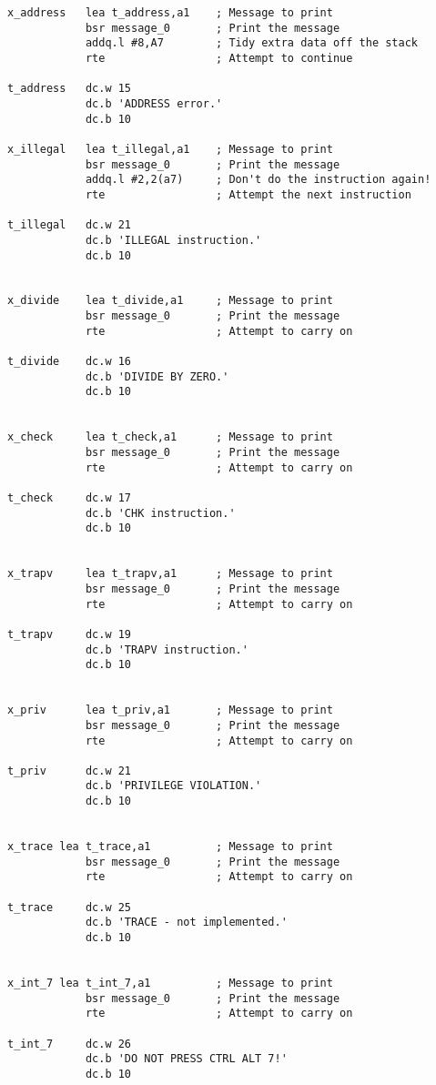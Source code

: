 \begin{lstlisting}[firstnumber=1,caption={Exception Handler for the QL},label={lst:ExceptionHandlerQL}]
x_address   lea t_address,a1    ; Message to print
            bsr message_0       ; Print the message
            addq.l #8,A7        ; Tidy extra data off the stack
            rte                 ; Attempt to continue

t_address   dc.w 15
            dc.b 'ADDRESS error.'
            dc.b 10

x_illegal   lea t_illegal,a1    ; Message to print
            bsr message_0       ; Print the message
            addq.l #2,2(a7)     ; Don't do the instruction again!
            rte                 ; Attempt the next instruction

t_illegal   dc.w 21
            dc.b 'ILLEGAL instruction.'
            dc.b 10


x_divide    lea t_divide,a1     ; Message to print
            bsr message_0       ; Print the message
            rte                 ; Attempt to carry on

t_divide    dc.w 16
            dc.b 'DIVIDE BY ZERO.'
            dc.b 10


x_check     lea t_check,a1      ; Message to print
            bsr message_0       ; Print the message
            rte                 ; Attempt to carry on

t_check     dc.w 17
            dc.b 'CHK instruction.'
            dc.b 10


x_trapv     lea t_trapv,a1      ; Message to print
            bsr message_0       ; Print the message
            rte                 ; Attempt to carry on

t_trapv     dc.w 19
            dc.b 'TRAPV instruction.'
            dc.b 10


x_priv      lea t_priv,a1       ; Message to print
            bsr message_0       ; Print the message
            rte                 ; Attempt to carry on

t_priv      dc.w 21
            dc.b 'PRIVILEGE VIOLATION.'
            dc.b 10


x_trace lea t_trace,a1          ; Message to print
            bsr message_0       ; Print the message
            rte                 ; Attempt to carry on

t_trace     dc.w 25
            dc.b 'TRACE - not implemented.'
            dc.b 10


x_int_7 lea t_int_7,a1          ; Message to print
            bsr message_0       ; Print the message
            rte                 ; Attempt to carry on

t_int_7     dc.w 26
            dc.b 'DO NOT PRESS CTRL ALT 7!'
            dc.b 10



\end{lstlisting}
